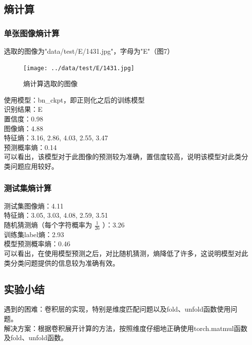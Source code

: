 \documentclass[a4paper]{article}
\begin{document}
\subsection{熵计算}
\subsubsection{单张图像熵计算}
选取的图像为"data/test/E/1431.jpg"，字母为"E"（图7）\\
\begin{figure}
    \centering
    \texttt{[image: ../data/test/E/1431.jpg]}
    \caption{熵计算选取的图像}
\end{figure}
使用模型：bn\_ckpt，即正则化之后的训练模型\\
识别结果：E\\
置信度：0.98\\
图像熵：4.88\\
特征熵：3.16, 2.86, 4.03, 2.55, 3.47\\
预测概率熵：0.14\\
可以看出，该模型对于此图像的预测较为准确，置信度较高，说明该模型对此类分类问题应用较好。\\

\subsubsection{测试集熵计算}
测试集图像熵：4.11\\
特征熵：3.05, 3.03, 4.08, 2.59, 3.51\\
随机猜测熵（每个字符概率为 $ \frac{1}{26} $ ）：3.26\\
训练集label熵：2.93\\
模型预测概率熵：0.46\\
可以看出，在使用模型预测之后，对比随机猜测，熵降低了许多，这说明模型对此类分类问题提供的信息较为准确有效。\\

\subsection{实验小结}
遇到的困难：卷积层的实现，特别是维度匹配问题以及fold、unfold函数使用问题。\\
解决方案：根据卷积展开计算的方法，按照维度仔细地正确使用torch.matmul函数及fold、unfold函数。\\
\end{document}
